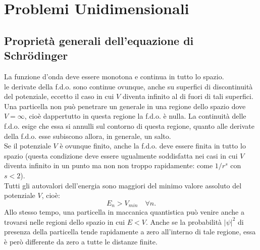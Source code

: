 \documentclass[a4paper,12pt,twoside]{book}
\newcommand*{\myfont}{\fontfamily{ppl}\selectfont}
\begin{document}
\fancypagestyle{plain}{%
\fancyhf{} %
\fancyfoot[C]{\bfseries \myfont{\thepage}} %
\renewcommand{\headrulewidth}{0pt}
\renewcommand{\footrulewidth}{0pt}}

\fancypagestyle{VS}{
\headheight = 15pt
\lhead[\myfont{\textit{\textbf{\thechapter\nouppercase{\leftmark}}}}]{\myfont{\textit{\textbf{\nouppercase{\leftmark}}}}}
\chead[]{}
\rhead[\myfont{\textbf{\thepage}}]{\myfont{\textbf{\thepage}}}

\lfoot[]{}
\cfoot[]{}
\rfoot[]{}
}
\setcounter{chapter}{9}

\pagestyle{VS}
\chapter{Problemi Unidimensionali}
\section{Proprietà generali dell'equazione di Schr\"{o}dinger}
La funzione d'onda deve essere monotona e continua in tutto lo spazio.\\
le derivate della f.d.o. sono continue ovunque, anche su superfici di discontinuità del potenziale, eccetto il caso in cui $V$ diventa infinito al di fuori di tali superfici.\\
Una particella non può penetrare un generale in una regione dello spazio dove $V =\infty$, cioè dappertutto in questa regione la f.d.o. è nulla. La continuità delle f.d.o. esige che essa si annulli sul contorno di questa regione, quanto alle derivate della f.d.o. esse subiscono allora, in generale, un salto.\\
Se il potenziale $V$ è ovunque finito, anche la f.d.o. deve essere finita in tutto lo spazio (questa condizione deve essere ugualmente soddisfatta nei casi in cui $V$ diventa infinito in un punto ma non non troppo rapidamente: come $1/r^s$ con $s<2$).\\
Tutti gli autovalori dell'energia sono maggiori del minimo valore assoluto del potenziale $V$, cioè:
\begin{equation}
E_n >V_{min} \quad \forall n.
\end{equation}
Allo stesso tempo, una particella in maccanica quantistica può venire anche a trovarsi nelle regioni dello spazio in cui $E<V$. Anche se la probabilità $|\psi|^2$ di presenza della particella tende rapidamente a zero all'interno di tale regione, essa è però differente da zero a tutte le distanze finite.\\ \\
\end{document}
